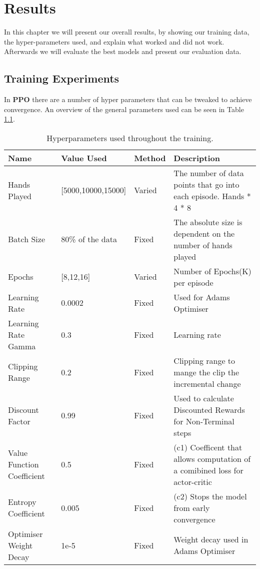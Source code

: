 \chapter{Results}
In this chapter we will present our overall results, by showing our training data, the hyper-parameters used, and
explain what worked and did not work.
Afterwards we will evaluate the best models and present our evaluation data.
\section{Training Experiments}
In \textbf{PPO} there are a number of hyper parameters that can be tweaked to achieve convergence.
An overview of the general parameters used can be seen in Table \ref{tab:hyper}.
\begin{table}[!ht]
    \begin{tabularx}{\linewidth}{lllX}
        \toprule
        Name & Value Used & Method & Description
        \\
        \midrule
        Hands Played & {[}5000,10000,15000{]} & Varied & The number of data points that go into each
        episode. Hands * 4 * 8 \\
        Batch Size & 80\% of the data & Fixed & The absolute size is dependent on the number of
        hands played \\
        Epochs & {[}8,12,16{]} & Varied & Number of Epochs(K) per episode
        \\
        Learning Rate & 0.0002 & Fixed & Used for Adams Optimiser
        \\
        Learning Rate Gamma & 0.3 & Fixed & Learning rate
        \\
        Clipping Range & 0.2 & Fixed & Clipping range to mange the clip the incremental
        change \\
        Discount Factor & 0.99 & Fixed & Used to calculate Discounted Rewards for
        Non-Terminal steps \\
        Value Function Coefficient & 0.5 & Fixed & (c1) Coefficent that allows computation of a
        comibined loss for actor-critic \\
        Entropy Coefficient        & 0.005            & Fixed  & (c2) Stops the model from early convergence
        \\
        Optimiser Weight Decay     & 1e-5             & Fixed  & Weight decay used in Adams Optimiser
        \\
        \bottomrule
    \end{tabularx}
    \caption{Hyperparameters used throughout the training.}
    \label{tab:hyper}
\end{table}

